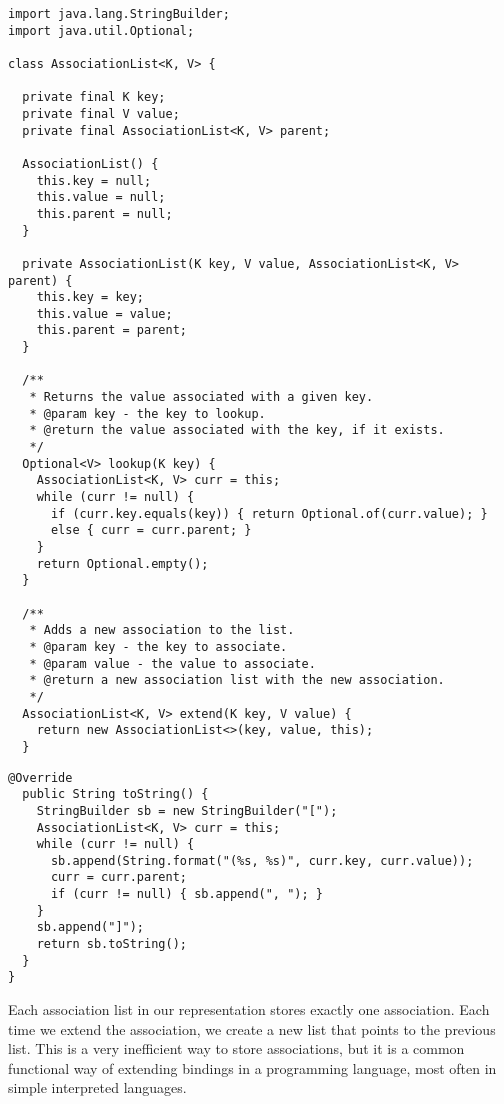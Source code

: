 \begin{lstlisting}[language=MyJavaNF]
import java.lang.StringBuilder;
import java.util.Optional;

class AssociationList<K, V> {
  
  private final K key;
  private final V value;
  private final AssociationList<K, V> parent;
  
  AssociationList() {
    this.key = null;
    this.value = null;
    this.parent = null;
  }

  private AssociationList(K key, V value, AssociationList<K, V> parent) {
    this.key = key;
    this.value = value;
    this.parent = parent;
  }
  
  /**
   * Returns the value associated with a given key.
   * @param key - the key to lookup.
   * @return the value associated with the key, if it exists.
   */
  Optional<V> lookup(K key) {
    AssociationList<K, V> curr = this;
    while (curr != null) {
      if (curr.key.equals(key)) { return Optional.of(curr.value); } 
      else { curr = curr.parent; }
    }
    return Optional.empty();
  }
  
  /**
   * Adds a new association to the list.
   * @param key - the key to associate.
   * @param value - the value to associate.
   * @return a new association list with the new association.
   */
  AssociationList<K, V> extend(K key, V value) {
    return new AssociationList<>(key, value, this);
  }
\end{lstlisting}
\begin{lstlisting}[language=MyJavaNF]
  @Override
  public String toString() {
    StringBuilder sb = new StringBuilder("[");
    AssociationList<K, V> curr = this;
    while (curr != null) {
      sb.append(String.format("(%s, %s)", curr.key, curr.value));
      curr = curr.parent;
      if (curr != null) { sb.append(", "); }
    }
    sb.append("]");
    return sb.toString();
  }
}
\end{lstlisting}
Each association list in our representation stores exactly one association. Each time we extend the association, we create a new list that points to the previous list. This is a very inefficient way to store associations, but it is a common functional way of extending bindings in a programming language, most often in simple interpreted languages.


